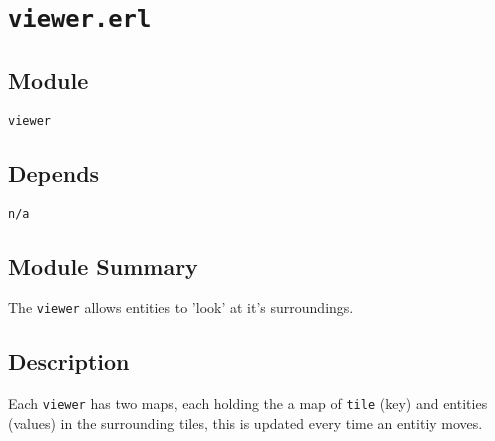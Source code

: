 \pagestyle{empty}
\section{\tt viewer.erl}
\subsection{Module}
\verb+viewer+
\subsection{Depends}
{\tt n/a}
\subsection{Module Summary}
The \verb+viewer+ allows entities to 'look' at it's surroundings.
\subsection{Description}
Each \verb+viewer+ has two maps, each holding the a map of \verb+tile+ (key) and entities (values) in the surrounding tiles, this is updated every time an entitiy moves.

